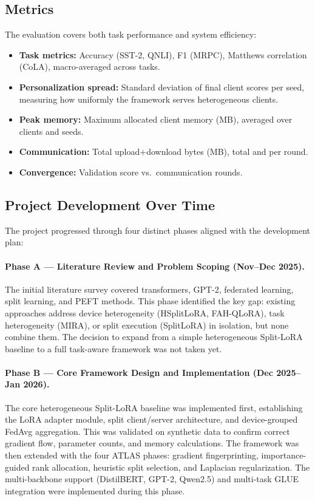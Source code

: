 \documentclass[11pt,a4paper]{article}
\begin{document}
\subsection{Metrics}

The evaluation covers both task performance and system efficiency:

\begin{itemize}
\item \textbf{Task metrics:} Accuracy (SST-2, QNLI), F1 (MRPC), Matthews correlation (CoLA), macro-averaged across tasks.
\item \textbf{Personalization spread:} Standard deviation of final client scores per seed, measuring how uniformly the framework serves heterogeneous clients.
\item \textbf{Peak memory:} Maximum allocated client memory (MB), averaged over clients and seeds.
\item \textbf{Communication:} Total upload+download bytes (MB), total and per round.
\item \textbf{Convergence:} Validation score vs.\ communication rounds.
\end{itemize}

\subsection{Project Development Over Time}

The project progressed through four distinct phases aligned with the development plan:

\paragraph{Phase A --- Literature Review and Problem Scoping (Nov--Dec 2025).}
The initial literature survey covered transformers, GPT-2, federated learning, split learning, and PEFT methods. This phase identified the key gap: existing approaches address device heterogeneity (HSplitLoRA, FAH-QLoRA), task heterogeneity (MIRA), or split execution (SplitLoRA) in isolation, but none combine them. The decision to expand from a simple heterogeneous Split-LoRA baseline to a full task-aware framework was not taken yet.

\paragraph{Phase B --- Core Framework Design and Implementation (Dec 2025--Jan 2026).}
The core heterogeneous Split-LoRA baseline was implemented first, establishing the LoRA adapter module, split client/server architecture, and device-grouped FedAvg aggregation. This was validated on synthetic data to confirm correct gradient flow, parameter counts, and memory calculations. The framework was then extended with the four ATLAS phases: gradient fingerprinting, importance-guided rank allocation, heuristic split selection, and Laplacian regularization. The multi-backbone support (DistilBERT, GPT-2, Qwen2.5) and multi-task GLUE integration were implemented during this phase.
\end{document}
